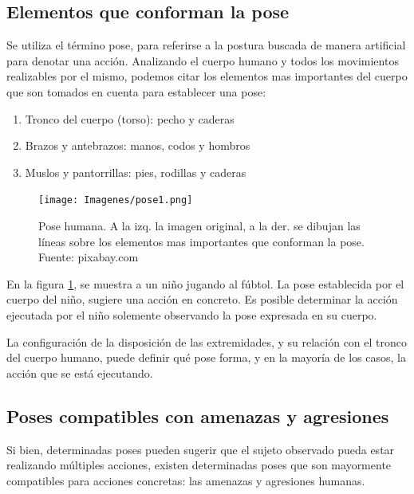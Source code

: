 \documentclass[a4paper,12pt,twoside]{article}
\begin{document}
\subsection{Elementos que conforman la pose}
Se utiliza el término pose, para referirse a la postura buscada de manera artificial para denotar una acción. Analizando el cuerpo humano y todos los movimientos realizables por el mismo, podemos citar los elementos mas importantes del cuerpo que son tomados en cuenta para establecer una pose: \begin{enumerate}
	\baselineskip 0pt
	\item Tronco del cuerpo (torso): pecho y caderas \\	
	\item Brazos y antebrazos: manos, codos y hombros \\
	\item Muslos y pantorrillas: pies, rodillas y caderas \\
\end{enumerate}	\baselineskip 14pt

\begin{figure}[h!]
	\texttt{[image: Imagenes/pose1.png]}
	\caption{Pose humana. A la izq. la imagen original, a la der. se dibujan las líneas sobre los elementos mas importantes que conforman la pose. Fuente: pixabay.com}
	\label{fig:pose1}
\end{figure}

En la figura \ref{fig:pose1}, se muestra a un niño jugando al fúbtol. La pose establecida por el cuerpo del niño, sugiere una acción en concreto. Es posible determinar la acción ejecutada por el niño solemente observando la pose expresada en su cuerpo. \par

La configuración de la disposición de las extremidades, y su relación con el tronco del cuerpo humano, puede definir qué pose forma, y en la mayoría de los casos, la acción que se está ejecutando. \par

\subsection{Poses compatibles con amenazas y agresiones}
Si bien, determinadas poses pueden sugerir que el sujeto observado pueda estar realizando múltiples acciones, existen determinadas poses que son mayormente compatibles para acciones concretas: las amenazas y agresiones humanas.\par
\end{document}
